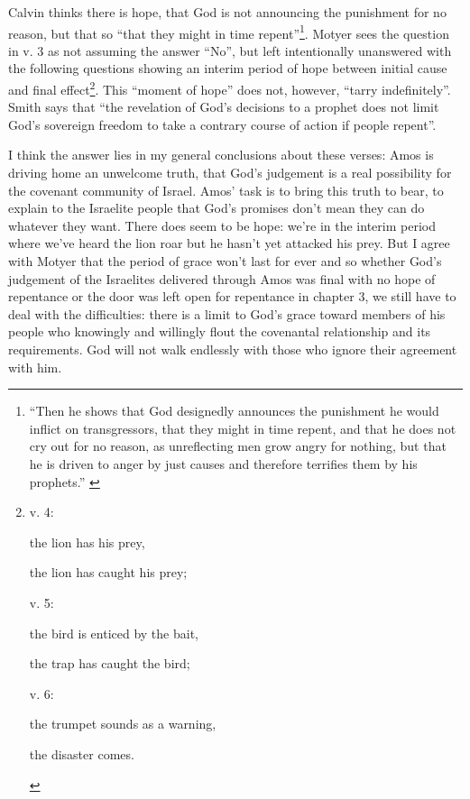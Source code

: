 Calvin thinks there is hope, that God is not announcing the punishment for no
reason, but that so \enquote{that they might in time repent}\footnote{%
    \enquote{Then he shows that God designedly announces the punishment he would
    inflict on transgressors, that they might in time repent, and that he does
    not cry out for no reason, as unreflecting men grow angry for nothing, but
    that he is driven to anger by just causes and therefore terrifies them by
    his prophets.}
    \autocite[203-204]{calvin+owen:1986}
}. Motyer sees the question in v. 3 as not assuming the answer \enquote{No}, but
left intentionally unanswered with the following questions showing an interim
period of hope between initial cause and final effect\footnote{%
    v. 4:
    \begin{inparaenum}[(a)]
    \item the lion has his prey,
    \item the lion has caught his prey;
    \end{inparaenum}
    v. 5:
    \begin{inparaenum}[(a)]
    \item the bird is enticed by the bait,
    \item the trap has caught the bird;
    \end{inparaenum}
    v. 6:
    \begin{inparaenum}[(a)]
    \item the trumpet sounds as a warning,
    \item the disaster comes. \autocite[71]{motyer:2011}
    \end{inparaenum}
}. This \enquote{moment of hope} does not, however, \enquote{tarry
indefinitely}\autocite[71]{motyer:2011}. Smith says that \enquote{the revelation
of God's decisions to a prophet does not limit God's sovereign freedom to take a
contrary course of action if people repent}\autocite[152]{smith:2017}.

I think the answer lies in my general conclusions about these verses: Amos is
driving home an unwelcome truth, that God's judgement is a real possibility for
the covenant community of Israel. Amos' task is to bring this truth to bear, to
explain to the Israelite people that God's promises don't mean they can do
whatever they want. There does seem to be hope: we're in the interim period
where we've heard the lion roar but he hasn't yet attacked his prey. But I agree
with Motyer that the period of grace won't last for ever and so whether God's
judgement of the Israelites delivered through Amos was final with no hope of
repentance or the door was left open for repentance in chapter 3, we still have
to deal with the difficulties: there is a limit to God's grace toward members of
his people who knowingly and willingly flout the covenantal relationship and its
requirements. God will not walk endlessly with those who ignore their agreement
with him.

